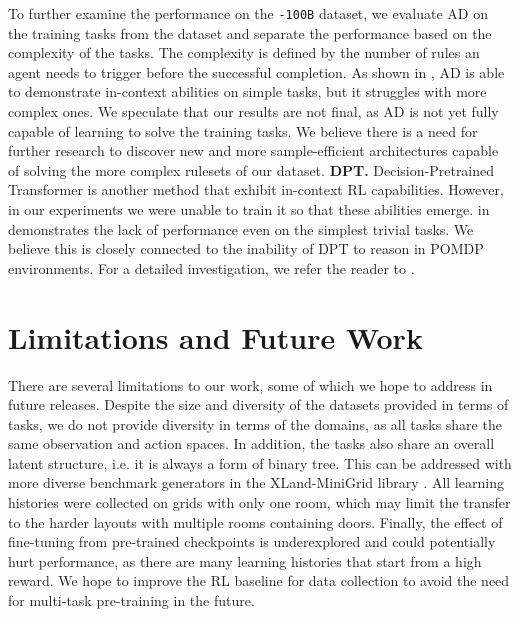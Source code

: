 \documentclass{article}
\begin{document}
To further examine the performance on the \texttt{-100B} dataset, we evaluate AD on the training tasks from the dataset and separate the performance based on the complexity of the tasks. The complexity is defined by the number of rules an agent needs to trigger before the successful completion. As shown in , AD is able to demonstrate in-context abilities on simple tasks, but it struggles with more complex ones. We speculate that our results are not final, as AD is not yet fully capable of learning to solve the training tasks. We believe there is a need for further research to discover new and more sample-efficient architectures capable of solving the more complex rulesets of our dataset.
\textbf{DPT.} Decision-Pretrained Transformer \citep{lee2023supervised} is another method that exhibit in-context RL capabilities. However, in our experiments we were unable to train it so that these abilities emerge.  in  demonstrates the lack of performance even on the simplest trivial tasks. We believe this is closely connected to the inability of DPT to reason in POMDP environments. For a detailed investigation, we refer the reader to .
\section{Limitations and Future Work}
\label{sec:limit}
There are several limitations to our work, some of which we hope to address in future releases. Despite the size and diversity of the datasets provided in terms of tasks, we do not provide diversity in terms of the domains, as all tasks share the same observation and action spaces. In addition, the tasks also share an overall latent structure, i.e. it is always a form of binary tree. This can be addressed with more diverse benchmark generators in the XLand-MiniGrid library \citep{nikulin2023xland}. All learning histories were collected on grids with only one room, which may limit the transfer to the harder layouts with multiple rooms containing doors. Finally, the effect of fine-tuning from pre-trained checkpoints is underexplored and could potentially hurt performance, as there are many learning histories that start from a high reward. We hope to improve the RL baseline for data collection to avoid the need for multi-task pre-training in the future.
\end{document}
